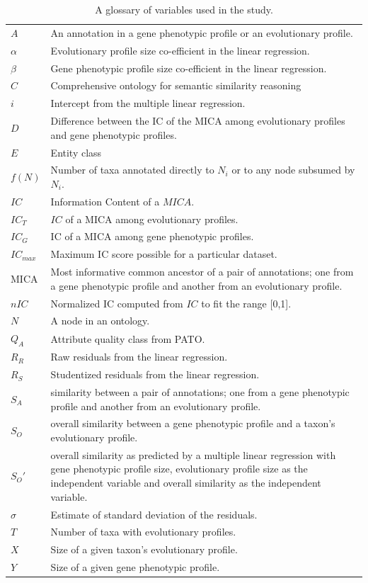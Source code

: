 \documentclass{article}
\begin{document}
\begin{table}
\caption{A glossary of variables used in the study.}
    \centering
    \begin{tabularx}{1\textwidth}{XX}
        \hline
 $A$ & An annotation in a gene phenotypic profile or an evolutionary profile. \\
 $\alpha$ & Evolutionary profile size co-efficient in the linear regression. \\
 $\beta$ & Gene phenotypic profile size co-efficient in the linear regression. \\
$C$ & Comprehensive ontology for semantic similarity reasoning \\
  $i$ & Intercept from the multiple linear regression. \\
$D$ & Difference between the IC of the MICA among evolutionary profiles and gene phenotypic profiles. \\
$E$ & Entity class \\
 $f(N)$ & Number of taxa annotated directly to $N_i$ or to any node subsumed by $N_i$.  \\
 $IC$ & Information Content of a $MICA$. \\
 $IC_T$ & $IC$ of a MICA among evolutionary profiles. \\
 $IC_G$ & IC of a MICA among gene phenotypic profiles. \\
 $IC_{max}$ & Maximum IC score possible for a particular dataset. \\
 MICA & Most informative common ancestor of a pair of annotations; one from a gene phenotypic profile and another from an evolutionary profile. \\
 $nIC$ & Normalized IC computed from $IC$ to fit the range [0,1]. \\
$N$ & A node in an ontology. \\
$Q_A$ & Attribute quality class from PATO. \\ 
 $R_R$ & Raw residuals from the linear regression. \\
 $R_S$ & Studentized residuals from the linear regression. \\
 $S_A$ & similarity between a pair of annotations; one from a gene phenotypic profile and another from an evolutionary profile. \\
 $S_O$ & overall similarity between a gene phenotypic profile and a taxon's evolutionary profile.  \\
  $S_O'$ & overall similarity as predicted by a multiple linear regression with gene phenotypic profile size, evolutionary profile size as the independent variable and overall similarity as the independent variable. \\
 $\sigma$ & Estimate of standard deviation of the residuals. \\
 
 $T$ & Number of taxa with evolutionary profiles. \\
 $X$ & Size of a given taxon's evolutionary profile. \\
 $Y$ & Size of a given gene phenotypic profile. \\
 
 \end{tabularx}
\end{table}


       

\end{document}
